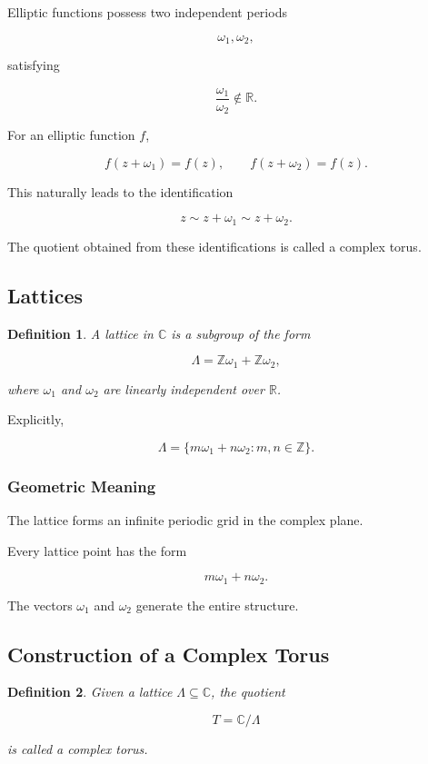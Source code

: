 \documentclass[12pt,a4paper]{article}
\theoremstyle{notespace}
\newtheorem{definition}{Definition}[subsection]
\begin{document}
Elliptic functions possess two independent periods

\[
\omega_1,\omega_2,
\]

satisfying

\[
\frac{\omega_1}{\omega_2}\notin\mathbb R.
\]

For an elliptic function \(f\),

\[
f(z+\omega_1)=f(z),
\qquad
f(z+\omega_2)=f(z).
\]

This naturally leads to the identification

\[
z
\sim
z+\omega_1
\sim
z+\omega_2.
\]

The quotient obtained from these identifications is called a complex torus.

\subsection{Lattices}

\begin{definition}
	A \emph{lattice} in \(\mathbb C\) is a subgroup of the form
	
	\[
	\Lambda
	=
	\mathbb Z\omega_1
	+
	\mathbb Z\omega_2,
	\]
	
	where \(\omega_1\) and \(\omega_2\) are linearly independent over \(\mathbb R\).
\end{definition}

Explicitly,

\[
\Lambda
=
\{
m\omega_1+n\omega_2
:
m,n\in\mathbb Z
\}.
\]

\subsubsection*{Geometric Meaning}

The lattice forms an infinite periodic grid in the complex plane.

Every lattice point has the form

\[
m\omega_1+n\omega_2.
\]

The vectors \(\omega_1\) and \(\omega_2\) generate the entire structure.

\subsection{Construction of a Complex Torus}

\begin{definition}
	Given a lattice \(\Lambda\subseteq\mathbb C\), the quotient
	
	\[
	T
	=
	\mathbb C/\Lambda
	\]
	
	is called a \emph{complex torus}.
\end{definition}
\end{document}
